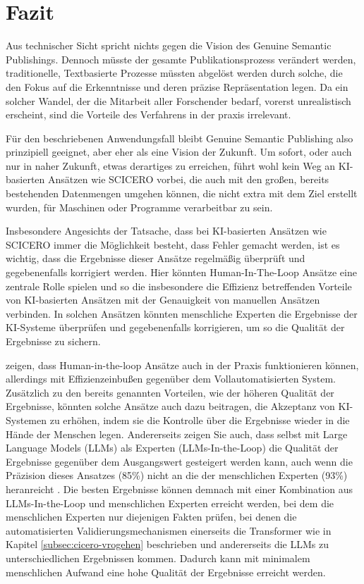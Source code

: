 \section{Fazit}
\label{sec:fazit}

Aus technischer Sicht spricht nichts gegen die Vision des Genuine Semantic Publishings.
Dennoch müsste der gesamte Publikationsprozess verändert werden, traditionelle, Textbasierte Prozesse müssten abgelöst werden durch solche, die den Fokus auf die Erkenntnisse und deren präzise Repräsentation legen.
Da ein solcher Wandel, der die Mitarbeit aller Forschender bedarf, vorerst unrealistisch erscheint, sind die Vorteile des Verfahrens in der praxis irrelevant.

Für den beschriebenen Anwendungsfall bleibt Genuine Semantic Publishing also prinzipiell geeignet, aber eher als eine Vision der Zukunft.
Um sofort, oder auch nur in naher Zukunft, etwas derartiges zu erreichen, führt wohl kein Weg an KI-basierten Ansätzen wie SCICERO vorbei, die auch mit den großen, bereits bestehenden Datenmengen umgehen können, die nicht extra mit dem Ziel erstellt wurden, für Maschinen oder Programme verarbeitbar zu sein.

Insbesondere Angesichts der Tatsache, dass bei KI-basierten Ansätzen wie SCICERO immer die Möglichkeit besteht, dass Fehler gemacht werden, ist es wichtig, dass die Ergebnisse dieser Ansätze regelmäßig überprüft und gegebenenfalls korrigiert werden.
Hier könnten Human-In-The-Loop Ansätze eine zentrale Rolle spielen und so die \textemdash insbesondere die Effizienz betreffenden \textemdash Vorteile von KI-basierten Ansätzen mit der Genauigkeit von manuellen Ansätzen verbinden.
In solchen Ansätzen könnten menschliche Experten die Ergebnisse der KI-Systeme überprüfen und gegebenenfalls korrigieren, um so die Qualität der Ergebnisse zu sichern.

\citet{Tsaneva2024EnhancingSK} zeigen, dass Human-in-the-loop Ansätze auch in der Praxis funktionieren können, allerdings mit Effizienzeinbußen gegenüber dem Vollautomatisierten System.
Zusätzlich zu den bereits genannten Vorteilen, wie der höheren Qualität der Ergebnisse, könnten solche Ansätze auch dazu beitragen, die Akzeptanz von KI-Systemen zu erhöhen, indem sie die Kontrolle über die Ergebnisse wieder in die Hände der Menschen legen.
Andererseits zeigen Sie auch, dass selbst mit Large Language Models (LLMs) als Experten (LLMs-In-the-Loop) die Qualität der Ergebnisse gegenüber dem Ausgangswert gesteigert werden kann, auch wenn die Präzision dieses Ansatzes (85\%) nicht an die der menschlichen Experten (93\%) heranreicht \cite{Tsaneva2024EnhancingSK}.
Die besten Ergebnisse können demnach mit einer Kombination aus LLMs-In-the-Loop und menschlichen Experten erreicht werden, bei dem die menschlichen Experten nur diejenigen Fakten prüfen, bei denen die automatisierten Validierungsmechanismen \textemdash einerseits die Transformer wie in Kapitel \ref{subsec:cicero-vrogehen} beschrieben und andererseits die LLMs \textemdash zu unterschiedlichen Ergebnissen kommen.
Dadurch kann mit minimalem menschlichen Aufwand eine hohe Qualität der Ergebnisse erreicht werden.
